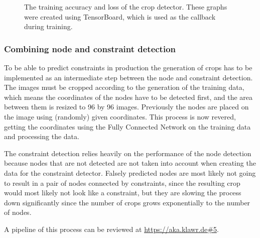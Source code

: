 \begin{figure}
\begin{subfigure}[b]{0.45\textwidth}
    \end{subfigure}
    \caption[TensorBoard output for the crop detector]{The training accuracy and loss of the crop detector. These graphs were created using TensorBoard, which is used as the callback during training.}
    \label{fig:crop_detector_tensorboard}
\end{figure}

\subsubsection{Combining node and constraint detection}

To be able to predict constraints in production the generation of crops has to be implemented as an intermediate step between the node and constraint detection.
The images must be cropped according to the generation of the training data, which means the coordinates of the nodes have to be detected first, and the area between them is resized to 96 by 96 images.
Previously the nodes are placed on the image using (randomly) given coordinates.
This process is now revered, getting the coordinates using the Fully Connected Network on the training data and processing the data.

The constraint detection relies heavily on the performance of the node detection because nodes that are not detected are not taken into account when creating the data for the constraint detector.
Falsely predicted nodes are most likely not going to result in a pair of nodes connected by constraints, since the resulting crop would most likely not look like a constraint, but they are slowing the process down significantly since the number of crops grows exponentially to the number of nodes.

A pipeline of this process can be reviewed at \url{https://aka.klawr.de\#5}.

